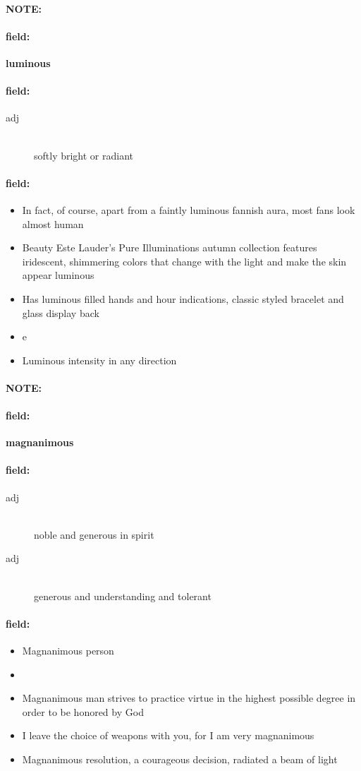\documentclass[12pt]{article}
\newenvironment{note}{\paragraph{NOTE:}}{}
\newenvironment{field}{\paragraph{field:}}{}
\begin{document}
\begin{note}
\begin{field}
\textbf{\large luminous}
\end{field}


\begin{field}
\begin{description}
\item[adj] \hfill \\ 
softly bright or radiant

\end{description}
\end{field}

\begin{field}
\begin{itemize}
\item In fact, of course, apart from a faintly luminous fannish aura, most fans look almost human
\item Beauty Este Lauder's Pure Illuminations autumn collection features iridescent, shimmering colors that change with the light and make the skin appear luminous
\item Has luminous filled hands and hour indications, classic styled bracelet and glass display back
\item e
\item Luminous intensity in any direction
\end{itemize}
\end{field}
\end{note}
\begin{note}
\begin{field}
\textbf{\large magnanimous}
\end{field}


\begin{field}
\begin{description}
\item[adj] \hfill \\ 
noble and generous in spirit

\item[adj] \hfill \\ 
generous and understanding and tolerant

\end{description}
\end{field}

\begin{field}
\begin{itemize}
\item Magnanimous person
\item 
\item Magnanimous man strives to practice virtue in the highest possible degree in order to be honored by God
\item I leave the choice of weapons with you, for I am very magnanimous
\item Magnanimous resolution, a courageous decision, radiated a beam of light
\end{itemize}
\end{field}
\end{note}
\end{document}
